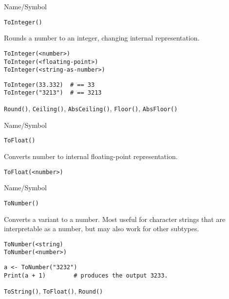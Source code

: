 \begin{desc}{Name/Symbol}
\item[Name/Symbol]  	\verb+ToInteger()+
              
\item[Description]  	Rounds a number to an integer, changing internal 
		representation.

\item[Usage]
\begin{verbatim}
ToInteger(<number>)
ToInteger(<floating-point>)
ToInteger(<string-as-number>)
\end{verbatim}

\item[Example]
\begin{verbatim}
ToInteger(33.332)  # == 33
ToInteger("3213")  # == 3213
\end{verbatim}

\item[See Also]    	\verb+Round()+, \verb+Ceiling()+, \verb+AbsCeiling()+, \verb+Floor()+, \verb+AbsFloor()+
\end{desc}

\rl


\begin{desc}{Name/Symbol}
\item[Name/Symbol]  	\verb+ToFloat()+

\item[Description] 	Converts number to internal floating-point representation.

\item[Usage]
\begin{verbatim}
ToFloat(<number>)
\end{verbatim}

\item[Example]	

\item[See Also]	
\end{desc}

\rl


\begin{desc}{Name/Symbol}
\item[Name/Symbol]  	\verb+ToNumber()+

\item[Description] Converts a variant to a number. Most useful for
  character strings that are interpretable as a number, but may also
  work for other subtypes.

\item[Usage]     
\begin{verbatim}
ToNumber(<string)
ToNumber(<number>)
\end{verbatim}

\item[Example]
\begin{verbatim}
a <- ToNumber("3232")
Print(a + 1)		# produces the output 3233. 
\end{verbatim}

\item[See Also]     	\verb+ToString()+, \verb+ToFloat()+, \verb+Round()+
\end{desc}

